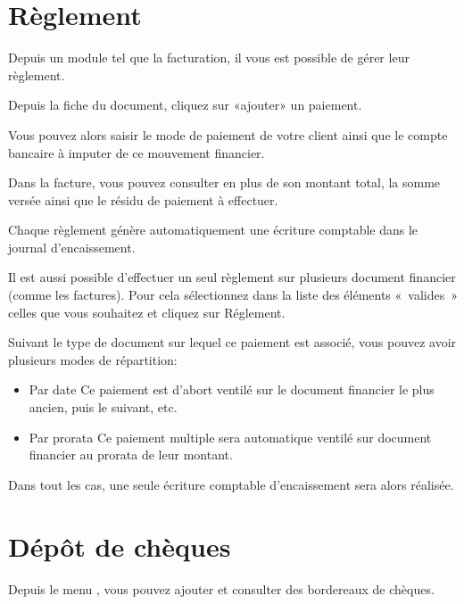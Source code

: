 \documentclass[a4paper,10pt,oneside,french]{sphinxmanual}
\begin{document}
\section{Règlement}
\label{\detokenize{payoff/payoff:reglement}}\label{\detokenize{payoff/payoff::doc}}
Depuis un module tel que la facturation, il vous est possible de gérer leur règlement.

Depuis la fiche du document, cliquez sur «ajouter» un paiement.
\begin{quote}

\noindent{}
\end{quote}

Vous pouvez alors saisir le mode de paiement de votre client ainsi que le compte bancaire à imputer de ce mouvement financier.

Dans la facture, vous pouvez consulter en plus de son montant total, la somme versée ainsi que le résidu de paiement à effectuer.

Chaque règlement génère automatiquement une écriture comptable dans le journal d’encaissement.

Il est aussi possible d’effectuer un seul règlement sur plusieurs document financier (comme les factures). Pour cela sélectionnez dans la liste des éléments « valides » celles que vous souhaitez et cliquez sur Réglement.
\begin{quote}

\noindent{}
\end{quote}

Suivant le type de document sur lequel ce paiement est associé, vous pouvez avoir plusieurs modes de répartition:
\begin{itemize}
\item {} 
Par date
Ce paiement est d’abort ventilé sur le document financier le plus ancien, puis le suivant, etc.

\item {} 
Par prorata
Ce paiement multiple sera automatique ventilé sur document financier au prorata de leur montant.

\end{itemize}

Dans tout les cas, une seule écriture comptable d’encaissement sera alors réalisée.


\section{Dépôt de chèques}
\label{\detokenize{payoff/deposit:depot-de-cheques}}\label{\detokenize{payoff/deposit::doc}}
Depuis le menu , vous pouvez ajouter et consulter des bordereaux de chèques.
\begin{quote}

\noindent{}
\end{quote}
\end{document}
